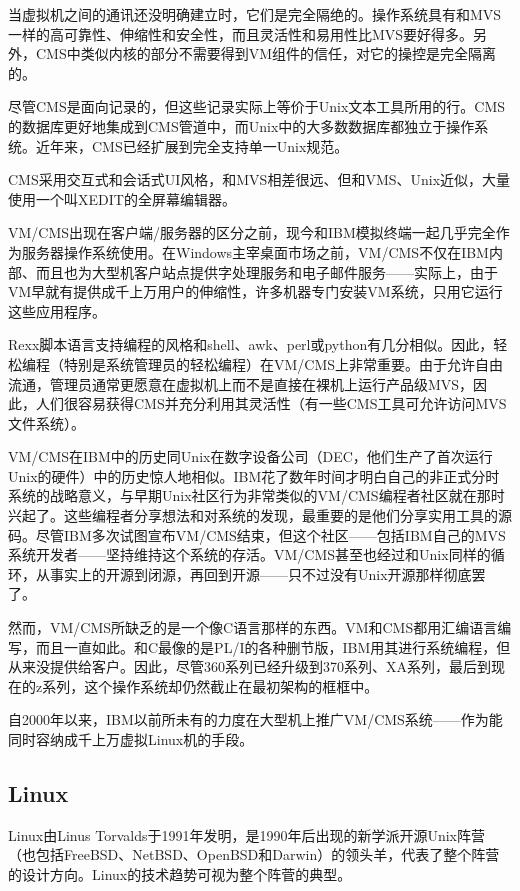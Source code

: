 \documentclass[12pt,oneside]{book}
\begin{document}
当虚拟机之间的通讯还没明确建立时，它们是完全隔绝的。操作系统具有和MVS一样的高可靠性、伸缩性和安全性，而且灵活性和易用性比MVS要好得多。另外，CMS中类似内核的部分不需要得到VM组件的信任，对它的操控是完全隔离的。

尽管CMS是面向记录的，但这些记录实际上等价于Unix文本工具所用的行。CMS的数据库更好地集成到CMS管道中，而Unix中的大多数数据库都独立于操作系统。近年来，CMS已经扩展到完全支持单一Unix规范。

CMS采用交互式和会话式UI风格，和MVS相差很远、但和VMS、Unix近似，大量使用一个叫XEDIT的全屏幕编辑器。

VM/CMS出现在客户端/服务器的区分之前，现今和IBM模拟终端一起几乎完全作为服务器操作系统使用。在Windows主宰桌面市场之前，VM/CMS不仅在IBM内部、而且也为大型机客户站点提供字处理服务和电子邮件服务——实际上，由于VM早就有提供成千上万用户的伸缩性，许多机器专门安装VM系统，只用它运行这些应用程序。

Rexx脚本语言支持编程的风格和shell、awk、perl或python有几分相似。因此，轻松编程（特别是系统管理员的轻松编程）在VM/CMS上非常重要。由于允许自由流通，管理员通常更愿意在虚拟机上而不是直接在裸机上运行产品级MVS，因此，人们很容易获得CMS并充分利用其灵活性（有一些CMS工具可允许访问MVS文件系统）。

VM/CMS在IBM中的历史同Unix在数字设备公司（DEC，他们生产了首次运行Unix的硬件）中的历史惊人地相似。IBM花了数年时间才明白自己的非正式分时系统的战略意义，与早期Unix社区行为非常类似的VM/CMS编程者社区就在那时兴起了。这些编程者分享想法和对系统的发现，最重要的是他们分享实用工具的源码。尽管IBM多次试图宣布VM/CMS结束，但这个社区——包括IBM自己的MVS系统开发者——坚持维持这个系统的存活。VM/CMS甚至也经过和Unix同样的循环，从事实上的开源到闭源，再回到开源——只不过没有Unix开源那样彻底罢了。

然而，VM/CMS所缺乏的是一个像C语言那样的东西。VM和CMS都用汇编语言编写，而且一直如此。和C最像的是PL/I的各种删节版，IBM用其进行系统编程，但从来没提供给客户。因此，尽管360系列已经升级到370系列、XA系列，最后到现在的z系列，这个操作系统却仍然截止在最初架构的框框中。

自2000年以来，IBM以前所未有的力度在大型机上推广VM/CMS系统——作为能同时容纳成千上万虚拟Linux机的手段。


\subsection{Linux}
Linux由Linus Torvalds于1991年发明，是1990年后出现的新学派开源Unix阵营（也包括FreeBSD、NetBSD、OpenBSD和Darwin）的领头羊，代表了整个阵营的设计方向。Linux的技术趋势可视为整个阵菅的典型。
\end{document}
